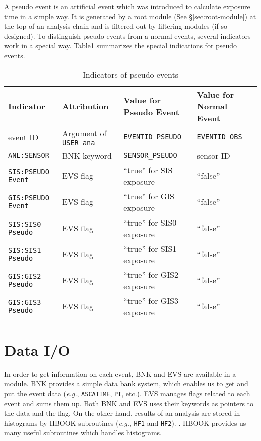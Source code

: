 A pseudo event is an artificial event
which was introduced to calculate exposure time in a simple way.
It is generated by a root module (See \S \ref{sec:root-module})
at the top of an analysis chain
and is filtered out by filtering modules (if so designed).
To distinguish pseudo events from a normal events,
several indicators work in a special way.
Table\ref{tab:pseudo-flag} summarizes the special indications
for pseudo events.

\begin{table}[htb]
\begin{center}
\begin{tabular}{|l|l|l|l|}
\hline
Indicator & Attribution & Value for Pseudo Event & Value for Normal Event \\
\hline
event ID & Argument of {\tt USER\_ana}
          & {\tt EVENTID\_PSEUDO}
          & {\tt EVENTID\_OBS} \\
{\tt ANL:SENSOR} & BNK keyword
          & {\tt SENSOR\_PSEUDO}
          & sensor ID \\
{\tt SIS:PSEUDO Event} & EVS flag
          & ``true'' for SIS exposure
          & ``false'' \\
{\tt GIS:PSEUDO Event} & EVS flag
          & ``true'' for GIS exposure
          & ``false'' \\
{\tt SIS:SIS0 Pseudo}   & EVS flag
          & ``true'' for SIS0 exposure
          & ``false'' \\
{\tt SIS:SIS1 Pseudo}   & EVS flag
          & ``true'' for SIS1 exposure
          & ``false'' \\
{\tt GIS:GIS2 Pseudo}  & EVS flag
          & ``true'' for GIS2 exposure
          & ``false'' \\
{\tt GIS:GIS3 Pseudo}  & EVS flag
          & ``true'' for GIS3 exposure
          & ``false'' \\
\hline
\end{tabular}
\caption{Indicators of pseudo events}
\label{tab:pseudo-flag}
\end{center}
\end{table}

\section{Data I/O}
In order to get information on each event,
BNK and EVS are available in a module.
BNK provides a simple data bank system,
which enables us to get and put the event data
({\em e.g.}, {\tt ASCATIME}, {\tt PI}, etc.).
EVS manages flags related to each event and sums them up.
Both BNK and EVS uses their keywords as pointers to the data and the flag.
On the other hand,
results of an analysis are stored in histograms
by HBOOK subroutines ({\em e.g.}, {\tt HF1} and {\tt HF2})\cite{HBOOK4}.
.
HBOOK provides us many useful subroutines which handles histograms.

